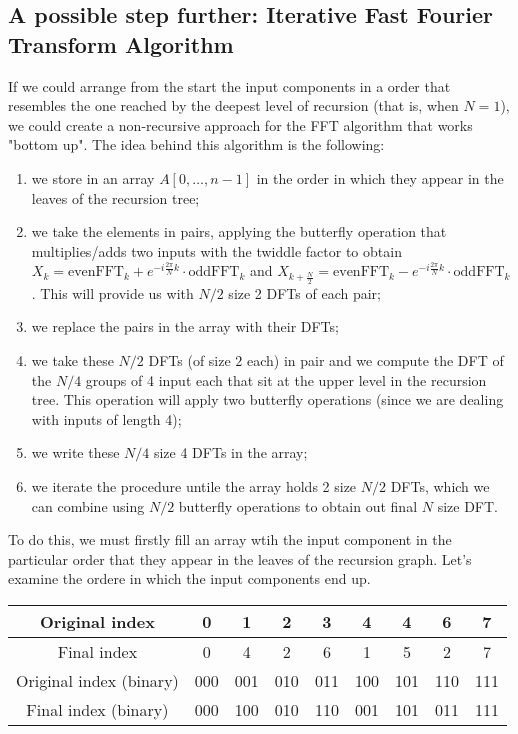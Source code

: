 \documentclass[class=article,crop=false]{standalone}
\begin{document}
\subsection{A possible step further: Iterative Fast Fourier Transform Algorithm}
If we could arrange from the start the input components in a order that resembles the one reached by the deepest level of recursion (that is, when $N=1$), we could create a non-recursive approach for the FFT algorithm that works "bottom up". The idea behind this algorithm is the following:
\begin{enumerate}
\item we store in an array $A[0,\ldots,n-1]$ in the order in which they appear in the leaves of the recursion tree;
\item we take the elements in pairs, applying the butterfly operation that multiplies/adds two inputs with the twiddle factor to obtain $X_k=\text{evenFFT}_k+e^{-i\frac{2\pi}{N}k}\cdot \text{oddFFT}_k$ and $X_{k+\frac{N}{2}}=\text{evenFFT}_k-e^{-i\frac{2\pi}{N}k}\cdot \text{oddFFT}_k$. This will provide us with $N/2$ size 2 DFTs of each pair;
\item we replace the pairs in the array with their DFTs;
\item we take these $N/2$ DFTs (of size $2$ each) in pair and we compute the DFT of the $N/4$ groups of 4 input each that sit at the upper level in the recursion tree. This operation will apply two butterfly operations (since we are dealing with inputs of length 4);
\item we write these $N/4$ size 4 DFTs in the array;
\item we iterate the procedure untile the array holds 2 size $N/2$ DFTs, which we can combine using $N/2$ butterfly operations to obtain out final $N$ size DFT.
\end{enumerate}
To do this, we must firstly fill an array wtih the input component in the particular order that they appear in the leaves of the recursion graph. Let's examine the ordere in which the input components end up.\begin{center}
\begin{tabular}{|c| c c c c c c c c|}
    \hline
Original index &0 &1 &2 &3 &4 &4 &6 &7\\
\hline
Final index &0 &4 &2 &6 &1 &5 &2 &7\\
\hline
Original index (binary) &000 &001 &010 &011 &100 &101 &110 &111\\
\hline
Final index (binary) &000 &100 &010 &110 &001 &101 &011 &111\\
\hline
\end{tabular}\end{center}
\end{document}
